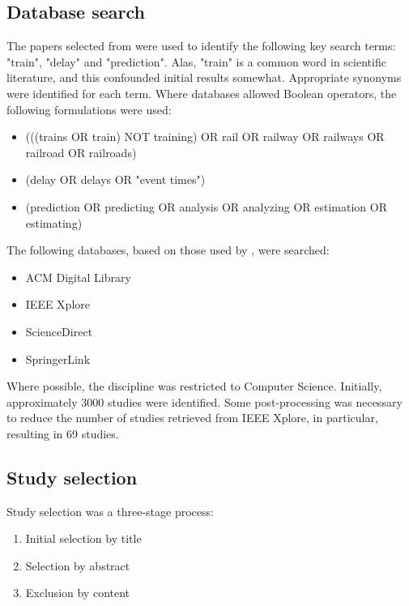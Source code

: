 \documentclass{article}
\begin{document}
\subsection{Database search}

The papers selected from \cite{ghofrani_et_al_2018} were used to identify the following key search terms: "train", "delay" and "prediction". Alas, "train" is a common word in scientific literature, and this confounded initial results somewhat. Appropriate synonyms were identified for each term. Where databases allowed Boolean operators, the following formulations were used:
\begin{itemize}
	\item (((trains OR train) NOT training) OR rail OR railway OR railways OR railroad OR railroads)
	\item (delay OR delays OR "event times")
	\item (prediction OR predicting OR analysis OR analyzing OR estimation OR estimating)
\end{itemize}

The following databases, based on those used by \cite{heckman_williams_2011}, were searched:

\begin{itemize}
	\item ACM Digital Library
	\item IEEE Xplore
	\item ScienceDirect
	\item SpringerLink
\end{itemize}

Where possible, the discipline was restricted to Computer Science. Initially, approximately 3000 studies were identified. Some post-processing was necessary to reduce the number of studies retrieved from IEEE Xplore, in particular, resulting in 69 studies.


\subsection{Study selection}

Study selection was a three-stage process:

\begin{enumerate}
	\item Initial selection by title
	\item Selection by abstract
	\item Exclusion by content
\end{enumerate}
\end{document}
